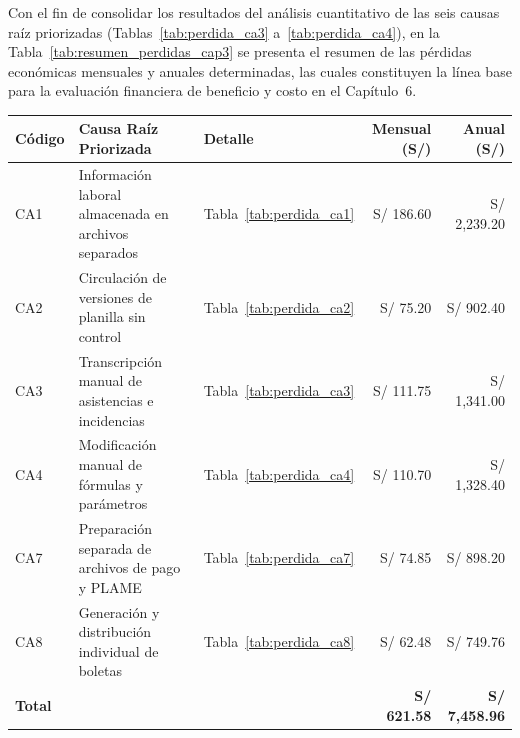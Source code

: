 \par\medskip

\clearpage
\par\medskip
Con el fin de consolidar los resultados del análisis cuantitativo de las seis causas raíz priorizadas 
(Tablas~\ref{tab:perdida_ca3} a~\ref{tab:perdida_ca4}), en la Tabla~\ref{tab:resumen_perdidas_cap3} 
se presenta el resumen de las pérdidas económicas mensuales y anuales determinadas, las cuales constituyen la línea base para la evaluación financiera de beneficio y costo en el Capítulo~6.

\par
\noindent
\begin{minipage}{\linewidth}

    \begingroup
    \renewcommand{\baselinestretch}{1}
    \footnotesize
    \setlength{\tabcolsep}{4pt}
    \renewcommand{\arraystretch}{1.25}

    \begin{tabularx}{\linewidth}{@{}p{1.3cm}X p{2.0cm}r r@{}}
        \toprule
        \textbf{Código} & \textbf{Causa Raíz Priorizada} & \textbf{Detalle} & \textbf{Mensual (S/)} & \textbf{Anual (S/)} \\ \midrule
        CA1 & Información laboral almacenada en archivos separados & Tabla~\ref{tab:perdida_ca1} & S/ 186.60 & S/ 2,239.20 \\ 
        CA2 & Circulación de versiones de planilla sin control & Tabla~\ref{tab:perdida_ca2} & S/ 75.20 & S/ 902.40 \\ 
        CA3 & Transcripción manual de asistencias e incidencias & Tabla~\ref{tab:perdida_ca3} & S/ 111.75 & S/ 1,341.00 \\ 
        CA4 & Modificación manual de fórmulas y parámetros & Tabla~\ref{tab:perdida_ca4} & S/ 110.70 & S/ 1,328.40 \\ 
        CA7 & Preparación separada de archivos de pago y PLAME & Tabla~\ref{tab:perdida_ca7} & S/ 74.85 & S/ 898.20 \\ 
        CA8 & Generación y distribución individual de boletas & Tabla~\ref{tab:perdida_ca8} & S/ 62.48 & S/ 749.76 \\ \midrule
        \textbf{Total} & & & \textbf{S/ 621.58} & \textbf{S/ 7,458.96} \\ \bottomrule
    \end{tabularx}
    \endgroup

\end{minipage}
\finBloqueAPA